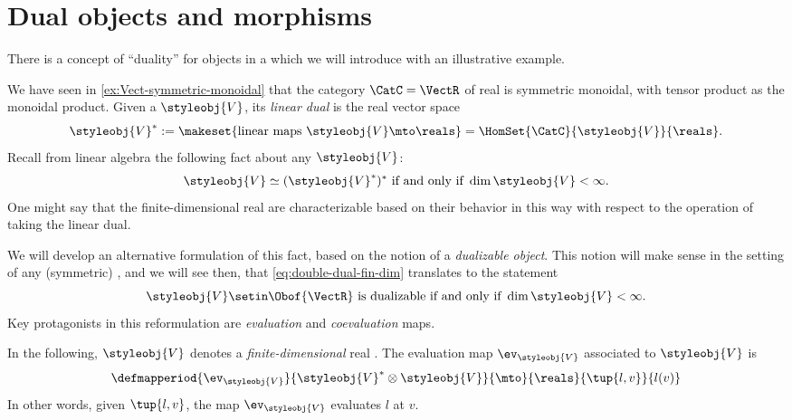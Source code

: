 
\section{Dual objects and morphisms}
\label{sec:dual-objects}
There is a concept of ``duality'' for objects in a  which we will introduce with an illustrative example.

We have seen in \cref{ex:Vect-symmetric-monoidal} that the category $\CatC = \VectR$ of real  is symmetric monoidal, with tensor product as the monoidal product.
Given a  $\styleobj{V} $, its \emph{linear dual} is the real vector space
\begin{equation}
    \label{eq:lin-dual-vecsp}
    \styleobj{V} ^{*} := \makeset{ \text{linear maps } \styleobj{V} \mto \reals } = \HomSet{\CatC}{\styleobj{V}}{ \reals}.
\end{equation}
%
Recall from linear algebra the following fact about any  $\styleobj{V} $:
%
\begin{equation}
    \label{eq:double-dual-fin-dim}
    \styleobj{V} \simeq (\styleobj{V} ^{*})^* \text{ if and only if } \dim \styleobj{V} < \infty.
\end{equation}
%
One might say that the finite-dimensional real  are characterizable based on their behavior in this way with respect to the operation of taking the linear dual.

We will develop an alternative formulation of this fact, based on the notion of a \emph{dualizable object}.
This notion will make sense in the setting of any (symmetric) , and we will see then, that \cref{eq:double-dual-fin-dim} translates to the statement
\begin{equation}
    \label{eq:dualizable-fin-dim}
    \styleobj{V} \setin \Obof{\VectR} \text{ is dualizable if and only if } \dim \styleobj{V} < \infty.
\end{equation}
%
Key protagonists in this reformulation are \emph{evaluation} and \emph{coevaluation} maps.

In the following, $\styleobj{V} $ denotes a \emph{finite-dimensional} real .
The evaluation map $\ev_\styleobj{V} $ associated to $\styleobj{V} $ is
\begin{equation}
    \label{eq:evaluation-vecsp}
    \defmapperiod{
        \ev_\styleobj{V}
    }{
        \styleobj{V}^* \otimes \styleobj{V}
    }{
        \mto
    }{
        \reals
    }{
        \tup{l, v}
    }{
        l(v)
    }
\end{equation}
In other words, given $\tup{l, v}$, the map $\ev_\styleobj{V} $ evaluates $l$ at $v$.

